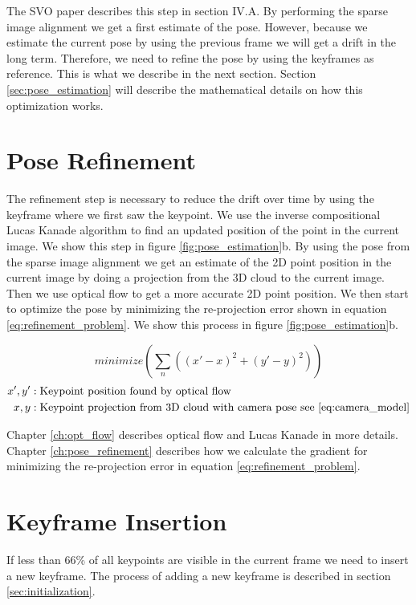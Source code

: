 \documentclass[11pt,a4paper,titlepage,oneside]{report}
\begin{document}
The SVO paper \cite{svo} describes this step in section IV.A. By performing the sparse image alignment we get a first estimate of the pose. However, because we estimate the current pose by using the previous frame we will get a drift in the long term. Therefore, we need to refine the pose by using the keyframes as reference. This is what we describe in the next section. Section \ref{sec:pose_estimation} will describe the mathematical details on how this optimization works.

\section{Pose Refinement}\label{sec:refinement}

The refinement step is necessary to reduce the drift over time by using the keyframe where we first saw the keypoint. We use the inverse compositional Lucas Kanade algorithm to find an updated position of the point in the current image. We show this step in figure \ref{fig:pose_estimation}b. By using the pose from the sparse image alignment we get an estimate of the 2D point position in the current image by doing a projection from the 3D cloud to the current image. Then we use optical flow to get a more accurate 2D point position. We then start to optimize the pose by minimizing the re-projection error shown in equation \ref{eq:refinement_problem}. We show this process in figure \ref{fig:pose_estimation}b.

\begin{equation}\label{eq:refinement_problem}
  minimize(\sum_n ((x'-x)^2+(y'-y)^2))
\end{equation}
\begin{align*}
  x',y'   &: \text{Keypoint position found by optical flow}\\
  x,y     &: \text{Keypoint projection from 3D cloud with camera pose see \ref{eq:camera_model}}
\end{align*}

Chapter \ref{ch:opt_flow} describes optical flow and Lucas Kanade in more details. Chapter \ref{ch:pose_refinement} describes how we calculate the gradient for minimizing the re-projection error in equation \ref{eq:refinement_problem}.

\section{Keyframe Insertion}
If less than 66\% of all keypoints are visible in the current frame we need to insert a new keyframe. The process of adding a new keyframe is described in section \ref{sec:initialization}.
\end{document}
